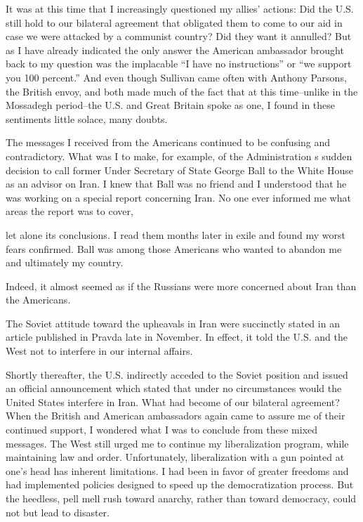It was at this time that I increasingly questioned my allies’ actions: Did the U.S. still hold to our bilateral agreement that obligated them to come to our aid in case we were attacked by a communist country? Did they want it annulled? But as I have already indicated the only answer the American ambassador brought back to my question was the implacable “I have no instructions” or “we support you 100 percent.” And even though Sullivan came often with Anthony Parsons, the British envoy, and both made much of the fact that at this time--unlike in the Mossadegh period--the U.S. and Great Britain spoke as one, I found in these sentiments little solace, many doubts. 

The messages I received from the Americans continued to be confusing and contradictory. What was I to make, for example, of the Administration s sudden decision to call former Under Secretary of State George Ball to the White House as an advisor on Iran. I knew that Ball was no friend and I understood that he was working on a special report concerning Iran. No one ever informed me what areas the report was to cover, 

let alone its conclusions. I read them months later in exile and found my worst fears confirmed. Ball was among those Americans who wanted to abandon me and ultimately my country. 

Indeed, it almost seemed as if the Russians were more concerned about Iran than the Americans. 

The Soviet attitude toward the upheavals in Iran were succinctly stated in an article published in Pravda late in November. In effect, it told the U.S. and the West not to interfere in our internal affairs. 

Shortly thereafter, the U.S. indirectly acceded to the Soviet position and issued an official announcement which stated that under no circumstances would the United States interfere in Iran. What had become of our bilateral agreement? When the British and American ambassadors again came to assure me of their continued support, I wondered what I was to conclude from these mixed messages. The West still urged me to continue my liberalization program, while maintaining law and order. Unfortunately, liberalization with a gun pointed at one’s head has inherent limitations. I had been in favor of greater freedoms and had implemented policies designed to speed up the democratization process. But the heedless, pell mell rush toward anarchy, rather than toward democracy, could not but lead to disaster. 

